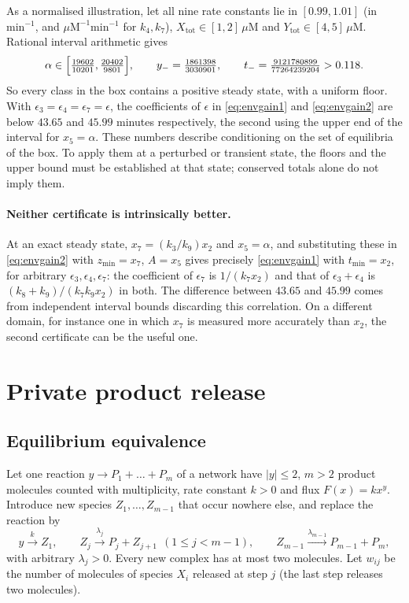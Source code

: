 \documentclass[11pt,a4paper]{article}
\theoremstyle{plain}
\theoremstyle{definition}
\theoremstyle{remark}
\newcommand{\muM}{\mu\mathrm{M}}
\newcommand{\permin}{\mathrm{min}^{-1}}
\newcommand{\Xtot}{X_{\mathrm{tot}}}
\newcommand{\Ytot}{Y_{\mathrm{tot}}}
\begin{document}
As a normalised illustration, let all nine rate constants lie in $[0.99,1.01]$ (in $\permin$, and $\muM^{-1}\permin$ for $k_4,k_7$), $\Xtot\in[1,2]\,\muM$ and $\Ytot\in[4,5]\,\muM$. Rational interval arithmetic gives
\[
  \alpha\in\Bigl[\tfrac{19602}{10201},\tfrac{20402}{9801}\Bigr],\qquad y_-=\tfrac{1861398}{3030901},\qquad t_-=\tfrac{9121780899}{77264239204}>0.118 .
\]
So every class in the box contains a positive steady state, with a uniform floor. With $\epsilon_3=\epsilon_4=\epsilon_7=\epsilon$, the coefficients of $\epsilon$ in \eqref{eq:envgain1} and \eqref{eq:envgain2} are below $43.65$ and $45.99$ minutes respectively, the second using the upper end of the interval for $x_5=\alpha$. These numbers describe conditioning on the set of equilibria of the box. To apply them at a perturbed or transient state, the floors and the upper bound must be established at that state; conserved totals alone do not imply them.

\paragraph{Neither certificate is intrinsically better.}
At an exact steady state, $x_7=(k_3/k_9)x_2$ and $x_5=\alpha$, and substituting these in \eqref{eq:envgain2} with $z_{\min}=x_7$, $A=x_5$ gives precisely \eqref{eq:envgain1} with $t_{\min}=x_2$, for arbitrary $\epsilon_3,\epsilon_4,\epsilon_7$: the coefficient of $\epsilon_7$ is $1/(k_7x_2)$ and that of $\epsilon_3+\epsilon_4$ is $(k_8+k_9)/(k_7k_9x_2)$ in both. The difference between $43.65$ and $45.99$ comes from independent interval bounds discarding this correlation. On a different domain, for instance one in which $x_7$ is measured more accurately than $x_2$, the second certificate can be the useful one.

\section{Private product release}\label{sec:release}

\subsection{Equilibrium equivalence}
Let one reaction $y\to P_1+\dots+P_{m}$ of a network have $|y|\le2$, $m>2$ product molecules counted with multiplicity, rate constant $k>0$ and flux $F(x)=kx^y$. Introduce new species $Z_1,\dots,Z_{m-1}$ that occur nowhere else, and replace the reaction by
\begin{equation}\label{eq:chain}
  y\xrightarrow{k}Z_1,\qquad Z_j\xrightarrow{\lambda_j}P_j+Z_{j+1}\ \ (1\le j<m-1),\qquad Z_{m-1}\xrightarrow{\lambda_{m-1}}P_{m-1}+P_m,
\end{equation}
with arbitrary $\lambda_j>0$. Every new complex has at most two molecules. Let $w_{ij}$ be the number of molecules of species $X_i$ released at step $j$ (the last step releases two molecules).
\end{document}
